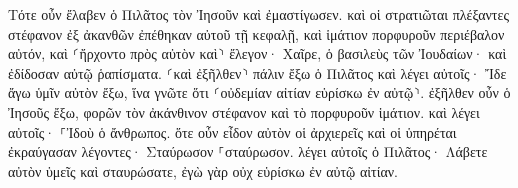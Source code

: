 \documentclass{openreader}
\begin{document}
Τότε οὖν ἔλαβεν ὁ Πιλᾶτος τὸν Ἰησοῦν καὶ ἐμαστίγωσεν. 
καὶ οἱ στρατιῶται πλέξαντες στέφανον ἐξ ἀκανθῶν ἐπέθηκαν αὐτοῦ τῇ κεφαλῇ, καὶ ἱμάτιον πορφυροῦν περιέβαλον αὐτόν, 
καὶ ⸂ἤρχοντο πρὸς αὐτὸν καὶ⸃ ἔλεγον· Χαῖρε, ὁ βασιλεὺς τῶν Ἰουδαίων· καὶ ἐδίδοσαν αὐτῷ ῥαπίσματα. 
⸂καὶ ἐξῆλθεν⸃ πάλιν ἔξω ὁ Πιλᾶτος καὶ λέγει αὐτοῖς· Ἴδε ἄγω ὑμῖν αὐτὸν ἔξω, ἵνα γνῶτε ὅτι ⸂οὐδεμίαν αἰτίαν εὑρίσκω ἐν αὐτῷ⸃. 
ἐξῆλθεν οὖν ὁ Ἰησοῦς ἔξω, φορῶν τὸν ἀκάνθινον στέφανον καὶ τὸ πορφυροῦν ἱμάτιον. καὶ λέγει αὐτοῖς· ⸀Ἰδοὺ ὁ ἄνθρωπος. 
ὅτε οὖν εἶδον αὐτὸν οἱ ἀρχιερεῖς καὶ οἱ ὑπηρέται ἐκραύγασαν λέγοντες· Σταύρωσον ⸀σταύρωσον. λέγει αὐτοῖς ὁ Πιλᾶτος· Λάβετε αὐτὸν ὑμεῖς καὶ σταυρώσατε, ἐγὼ γὰρ οὐχ εὑρίσκω ἐν αὐτῷ αἰτίαν. 
\end{document}
